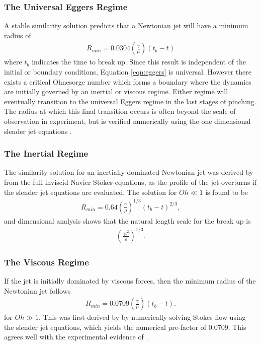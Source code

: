 \documentclass[11pt]{article}
\begin{document}
\subsubsection{The Universal Eggers Regime}
A stable similarity solution predicts that a Newtonian jet will have a minimum radius of
\begin{align}
R_{min} = 0.0304 \left( \frac{\gamma}{\mu} \right) \left(t_b - t \right)
\label{eqn:eggers}
\end{align}
where $t_b$ indicates the time to break up. Since this result is independent of the initial or boundary conditions, Equation \ref{eqn:eggers} is universal. However there exists a critical Ohnesorge number which forms a boundary where the dynamics are initially governed by an inertial or viscous regime. Either regime will eventually transition to the universal Eggers regime in the last stages of pinching. The radius at which this final transition occurs is often beyond the scale of observation in experiment, but is verified numerically using the one dimensional slender jet equations \citep{hall2015report}.

\subsubsection{The Inertial Regime}
The similarity solution for an inertially dominated Newtonian jet was derived by \cite{day1998self} from the full inviscid Navier Stokes equations, as the profile of the jet overturns if the slender jet equations are evaluated. The solution for $Oh \ll 1$ is found to be
\begin{align}
R_{min} = 0.64 \left( \frac{\gamma}{\rho}\right)^{1/3} \left(t_b - t \right)^{2/3},
\end{align}
and dimensional analysis shows that the natural length scale for the break up is
\begin{align*}
\left( \frac{\gamma t^2}{\rho} \right)^{1/3}.
\end{align*}

\subsubsection{The Viscous Regime}
If the jet is initially dominated by viscous forces, then the minimum radius of the Newtonian jet follows
\begin{align}
R_{min} = 0.0709 \left( \frac{\gamma}{\mu} \right) \left(t_b -t \right).
\end{align}
for $Oh \gg 1$. This was first derived by \cite{papageorgiou1995breakup} by numerically solving Stokes flow using the slender jet equations, which yields the numerical pre-factor of 0.0709. This agrees well with the experimental evidence of \cite{mckinley2000extract}.
\end{document}
